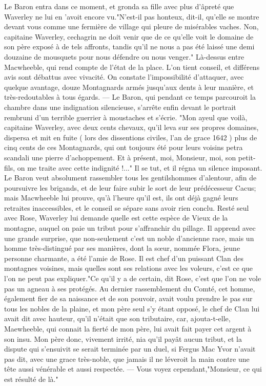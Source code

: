 Le Baron entra dans ce moment, et gronda sa fille avec plus d'âpreté que Waverley ne lui en 'avoit encore vu."N'est-il pas honteux, dit-il, qu'elle se montre devant vous comme une fermière de village qui pleure de misérables vaches. Non, capitaine Waverley, cechagrin ne doit venir que de ce qu'elle voit le domaine de son père exposé à de tels affronts, tandis qu'il ne nous a pas été laissé\setcounter{page}{557} une demi douzaine de mousquets pour nous défendre ou nous venger."
Là-dessus entre Macwheeble, qui rend compte de l'état de la place. L'on tient conseil, et différens avis sont débattus avec vivacité. On constate l'impossibilité d'attaquer, avec quelque avantage, douze Montagnards armés jusqu'aux dents à leur manière, et très-redoutables à tous égards. — Le Baron, qui pendant ce temps parcouroit la chambre dans une indignation silencieuse, s'arrête enfin devant le portrait rembruni d'un terrible guerrier à moustaches et s'écrie. "Mon ayeul que voilà, capitaine Waverley, avec deux cents chevaux, qu'il leva sur ses propres domaines, dispersa et mit en fuite ( lors des dissentions civiles, l'an de grace 1642 ) plus de cinq cents de ces Montagnards, qui ont toujours été pour leurs voisins petra scandali une pierre d'achoppement. Et à présent, moi, Monsieur, moi, son petit-fils, on me traite avec cette indignité !..." Il se tut, et il régna un silence imposant.
Le Baron veut absolument rassembler tous les gentilshommes d'alentour, afin de poursuivre les brigands, et de leur faire subir le sort de leur prédécesseur Cacus; mais Macwheeble lui prouve, qu'à l'heure qu'il est, ils ont déjà gagné leurs retraites inaccessibles\setcounter{page}{558}, et le conseil se sépare sans avoir rien conclu. Resté seul avec Rose, Waverley lui demande quelle est cette espèce de Vieux de la montagne, auquel on paie un tribut pour s'affranchir du pillage. Il apprend avec une grande surprise, que non-seulement c'est un noble d'ancienne race, mais un homme très-distingué par ses manières, dont la sœur, nommée Flora, jeune personne charmante, a été l'amie de Rose. Il est chef d'un puissant Clan des montagnes voisines, mais quelles sont ses relations avec les voleurs, c'est ce que l'on ne peut pas expliquer."Ce qu'il y a de certain, dit Rose, c'est que l'on ne vole pas un agneau à ses protégés. Au dernier rassemblement du Comté, cet homme, également fier de sa naissance et de son pouvoir, avait voulu prendre le pas sur tous les nobles de la plaine, et mon père seul s'y étant opposé, le chef de Clan lui avait dit avec hauteur, qu'il n'était que son tributaire, car, ajouta-t-elle, Maewheeble, qui connait la fierté de mon père, lui avait fait payer cet argent à son insu. Mon père donc, vivement irrité, nia qu'il payât aucun tribut, et la dispute qui s'ensuivit se serait terminée par un duel, si Fergus Mac Yvor n'avait pas dit, avec une\setcounter{page}{559} grace très-noble, que jamais il ne léveroit la main contre une tête aussi vénérable et aussi respectée. — Vous voyez cependant,"Monsieur, ce qui est résulté de là."
